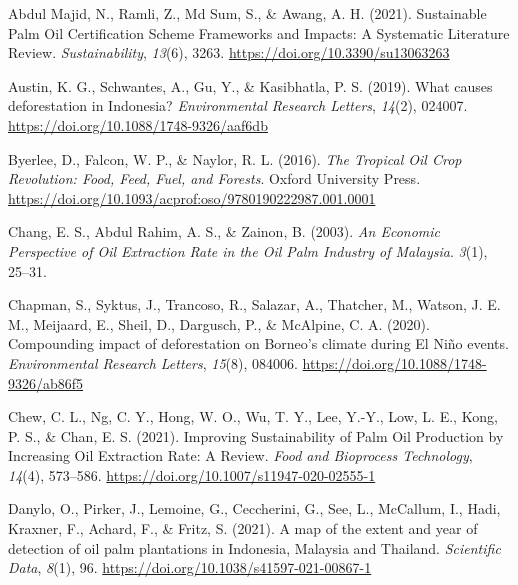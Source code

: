 \documentclass[
  letterpaper,
  DIV=11,
  numbers=noendperiod]{scrreprt}
\newlength{\cslhangindent}
\newlength{\cslentryspacingunit} %
\newenvironment{CSLReferences}[2] %
 {%
  \setlength{\parindent}{0pt}
  \ifodd #1
  \let\oldpar\par
  \def\par{\hangindent=\cslhangindent\oldpar}
  \fi
  \setlength{\parskip}{#2\cslentryspacingunit}
 }%
 {}
\begin{document}
\hypertarget{refs}{}
\begin{CSLReferences}{1}{0}
\leavevmode{}%
Abdul Majid, N., Ramli, Z., Md Sum, S., \& Awang, A. H. (2021).
Sustainable {Palm Oil Certification Scheme Frameworks} and {Impacts}: {A
Systematic Literature Review}. \emph{Sustainability}, \emph{13}(6),
3263. \url{https://doi.org/10.3390/su13063263}

\leavevmode{}%
Austin, K. G., Schwantes, A., Gu, Y., \& Kasibhatla, P. S. (2019). What
causes deforestation in {Indonesia}? \emph{Environmental Research
Letters}, \emph{14}(2), 024007.
\url{https://doi.org/10.1088/1748-9326/aaf6db}

\leavevmode{}%
Byerlee, D., Falcon, W. P., \& Naylor, R. L. (2016). \emph{The {Tropical
Oil Crop Revolution}: {Food}, {Feed}, {Fuel}, and {Forests}}. {Oxford
University Press}.
\url{https://doi.org/10.1093/acprof:oso/9780190222987.001.0001}

\leavevmode{}%
Chang, E. S., Abdul Rahim, A. S., \& Zainon, B. (2003). \emph{An
{Economic Perspective} of {Oil Extraction Rate} in the {Oil Palm
Industry} of {Malaysia}}. \emph{3}(1), 25--31.

\leavevmode{}%
Chapman, S., Syktus, J., Trancoso, R., Salazar, A., Thatcher, M.,
Watson, J. E. M., Meijaard, E., Sheil, D., Dargusch, P., \& McAlpine, C.
A. (2020). Compounding impact of deforestation on {Borneo}'s climate
during {El Niño} events. \emph{Environmental Research Letters},
\emph{15}(8), 084006. \url{https://doi.org/10.1088/1748-9326/ab86f5}

\leavevmode{}%
Chew, C. L., Ng, C. Y., Hong, W. O., Wu, T. Y., Lee, Y.-Y., Low, L. E.,
Kong, P. S., \& Chan, E. S. (2021). Improving {Sustainability} of {Palm
Oil Production} by {Increasing Oil Extraction Rate}: A {Review}.
\emph{Food and Bioprocess Technology}, \emph{14}(4), 573--586.
\url{https://doi.org/10.1007/s11947-020-02555-1}

\leavevmode{}%
Danylo, O., Pirker, J., Lemoine, G., Ceccherini, G., See, L., McCallum,
I., Hadi, Kraxner, F., Achard, F., \& Fritz, S. (2021). A map of the
extent and year of detection of oil palm plantations in {Indonesia},
{Malaysia} and {Thailand}. \emph{Scientific Data}, \emph{8}(1), 96.
\url{https://doi.org/10.1038/s41597-021-00867-1}


\end{CSLReferences}
\end{document}

